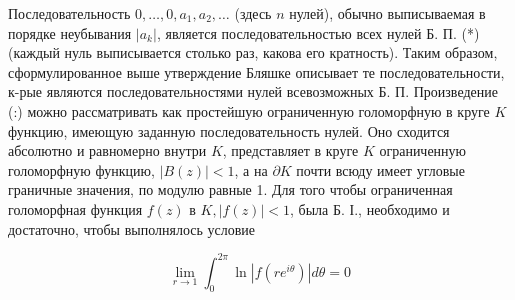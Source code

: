 \documentclass[10pt]{article}
\begin{document}
Последовательность $0, \ldots, 0, a_{1}, a_{2}, \ldots$ (здесь $n$ нулей), обычно выписываемая в порядке неубывания $\left|a_{k}\right|$, является последовательностью всех нулей Б. П. (*) (каждый нуль выписывается столько раз, какова его кратность). Таким образом, сформулированное выше утверждение Бляшке описывает те последовательности, к-рые являются последовательностями нулей всевозможных Б. П. Произведение (:) можно рассматривать как простейшую ограниченную голоморфную в круге $K$ функцию, имеющую заданную последовательность нулей. Оно сходится абсолютно и равномерно внутри $K$, представляет в круге $K$ ограниченную голоморфную функцию, $|B(z)|<1$, а на $\partial K$ почти всюду имеет угловые граничные значения, по модулю равные 1. Для того чтобы ограниченная голоморфная функция $f(z)$ в $K,|f(z)|<1$, была Б. І., необходимо и достаточно, чтобы выполнялось условие



\[

\lim _{r \rightarrow 1} \int_{0}^{2 \pi} \ln \left|f\left(r e^{i \theta}\right)\right| d \theta=0

\]
\end{document}
